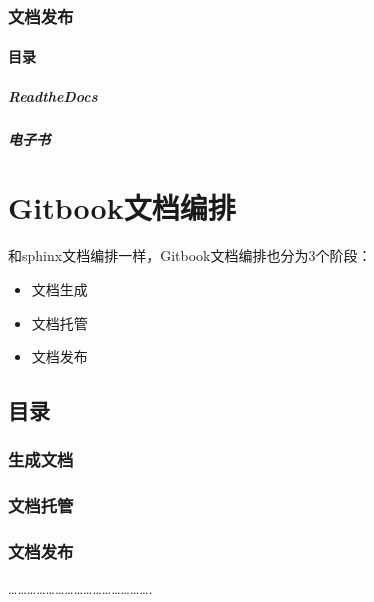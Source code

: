 \documentclass[a4paper,10pt,english]{sphinxmanual}
\begin{document}
\subsubsection{文档发布}
\label{\detokenize{sphinx/3-release/index::doc}}\label{\detokenize{sphinx/3-release/index:id1}}

\paragraph{目录}
\label{\detokenize{sphinx/3-release/index:id2}}

\subparagraph{ReadtheDocs}
\label{\detokenize{sphinx/3-release/1-docs:readthedocs}}\label{\detokenize{sphinx/3-release/1-docs::doc}}

\subparagraph{电子书}
\label{\detokenize{sphinx/3-release/2-ebook::doc}}\label{\detokenize{sphinx/3-release/2-ebook:id1}}

\section{Gitbook文档编排}
\label{\detokenize{gitbook/index:gitbook}}\label{\detokenize{gitbook/index::doc}}
和sphinx文档编排一样，Gitbook文档编排也分为3个阶段：
\begin{itemize}
\item {} 
文档生成

\item {} 
文档托管

\item {} 
文档发布

\end{itemize}


\subsection{目录}
\label{\detokenize{gitbook/index:id1}}

\subsubsection{生成文档}
\label{\detokenize{gitbook/1-generate/index::doc}}\label{\detokenize{gitbook/1-generate/index:id1}}

\subsubsection{文档托管}
\label{\detokenize{gitbook/2-collocation/index::doc}}\label{\detokenize{gitbook/2-collocation/index:id1}}

\subsubsection{文档发布}
\label{\detokenize{gitbook/3-release/index::doc}}\label{\detokenize{gitbook/3-release/index:id1}}
……………………………………….



\renewcommand{\indexname}{Index}
\printindex
\end{document}
